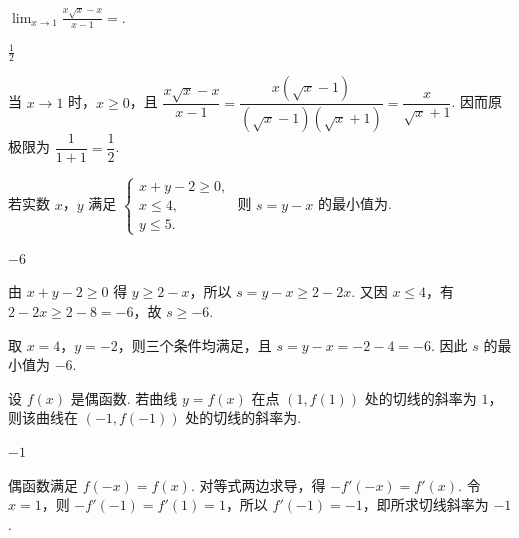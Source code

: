 \begin{problem}
\(\displaystyle\lim_{x\to 1}\frac{x\sqrt{x} - x}{x - 1} =\)\fillinblank{}.

\begin{answer}
\(\frac{1}{2}\)
\end{answer}

\begin{solution}
当 \(x\to1\) 时，\(x\geqslant0\)，且 \(\dfrac{x\sqrt{x}-x}{x-1}=\dfrac{x(\sqrt{x}-1)}{(\sqrt{x}-1)(\sqrt{x}+1)}=\dfrac{x}{\sqrt{x}+1}\). 因而原极限为 \(\dfrac{1}{1+1}=\dfrac12\).
\end{solution}
\end{problem}

\begin{problem}
若实数 \(x\)，\(y\) 满足 \(\begin{cases}
x + y - 2 \geqslant 0,\\
x \leqslant 4,\\
y \leqslant 5.
\end{cases}\) 则 \(s = y - x\) 的最小值为\fillinblank{}.

\begin{answer}
\(-6\)
\end{answer}

\begin{solution}
由 \(x+y-2\geqslant0\) 得 \(y\geqslant2-x\)，所以 \(s=y-x\geqslant2-2x\). 又因 \(x\leqslant4\)，有 \(2-2x\geqslant2-8=-6\)，故 \(s\geqslant-6\).

取 \(x=4\)，\(y=-2\)，则三个条件均满足，且 \(s=y-x=-2-4=-6\). 因此 \(s\) 的最小值为 \(-6\).
\end{solution}
\end{problem}

\begin{problem}
设 \( f(x) \) 是偶函数. 若曲线 \( y = f(x) \) 在点 \( (1, f(1)) \) 处的切线的斜率为 \(1\)，则该曲线在 \((-1, f(-1))\) 处的切线的斜率为\fillinblank{}.

\begin{answer}
\(-1\)
\end{answer}

\begin{solution}
偶函数满足 \(f(-x)=f(x)\). 对等式两边求导，得 \(-f'(-x)=f'(x)\). 令 \(x=1\)，则 \(-f'(-1)=f'(1)=1\)，所以 \(f'(-1)=-1\)，即所求切线斜率为 \(-1\).
\end{solution}
\end{problem}

